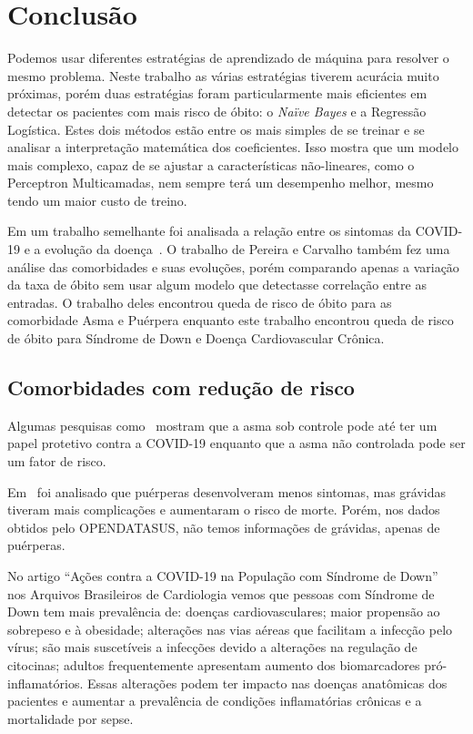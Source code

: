 \chapter{Conclusão}
\label{ch:conclusao}

Podemos usar diferentes estratégias de aprendizado de máquina para resolver o mesmo problema.
Neste trabalho as várias estratégias tiverem acurácia muito próximas, porém duas estratégias foram particularmente mais eficientes em detectar os pacientes com mais risco de óbito: o \textit{Naïve Bayes} e a Regressão Logística.
Estes dois métodos estão entre os mais simples de se treinar e se analisar a interpretação matemática dos coeficientes.
Isso mostra que um modelo mais complexo, capaz de se ajustar a características não-lineares, como o Perceptron Multicamadas, nem sempre terá um desempenho melhor, mesmo tendo um maior custo de treino.

Em um trabalho semelhante foi analisada a relação entre os sintomas da COVID-19 e a evolução da doença~\cite{unicamp}.
O trabalho de Pereira e Carvalho também fez uma análise das comorbidades e suas evoluções, porém comparando apenas a variação da taxa de óbito sem usar algum modelo que detectasse correlação entre as entradas.
O trabalho deles encontrou queda de risco de óbito para as comorbidade Asma e Puérpera enquanto este trabalho encontrou queda de risco de óbito para Síndrome de Down e Doença Cardiovascular Crônica.


\section{Comorbidades com redução de risco}
\label{sec:comorbidades-com-reducao-de-risco}

Algumas pesquisas como~\cite{carli2021asthma} mostram que a asma sob controle pode até ter um papel protetivo contra a COVID-19 enquanto que a asma não controlada pode ser um fator de risco.

Em~\cite{serra2021covid} foi analisado que puérperas desenvolveram menos sintomas, mas grávidas tiveram mais complicações e aumentaram o risco de morte. Porém, nos dados obtidos pelo OPENDATASUS, não temos informações de grávidas, apenas de puérperas.

No artigo ``Ações contra a COVID-19 na População com Síndrome de Down''~\cite{russo2020accoes} nos Arquivos Brasileiros de Cardiologia vemos que pessoas com Síndrome de Down tem mais prevalência de: doenças cardiovasculares;
maior propensão ao sobrepeso e à obesidade;
alterações nas vias aéreas que facilitam a infecção pelo vírus;
são mais suscetíveis a infecções devido a alterações na regulação de citocinas;
adultos frequentemente apresentam aumento dos biomarcadores pró-inflamatórios.
Essas alterações podem ter impacto nas doenças anatômicas dos pacientes e aumentar a prevalência de condições inflamatórias crônicas e a mortalidade por sepse.

